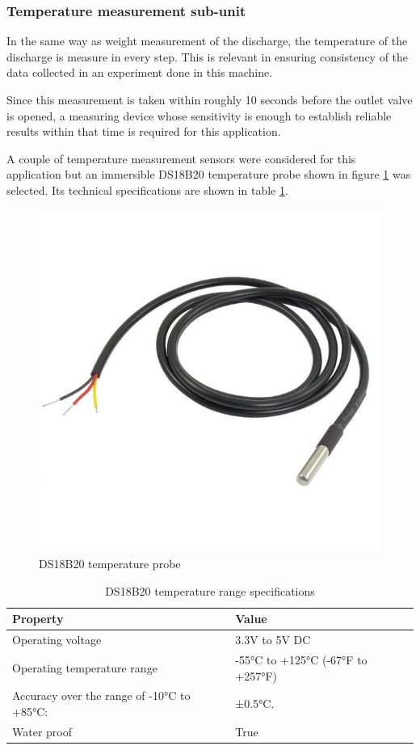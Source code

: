 \subsubsection{Temperature measurement sub-unit}
In the same way as weight measurement of the discharge, the temperature of the discharge is measure in every step. This is relevant in ensuring consistency of the data collected in an experiment done in this machine. 
\par
Since this measurement is taken within roughly 10 seconds before the outlet valve is opened, a measuring device whose sensitivity is enough to establish reliable results within that time is required for this application.
\par
A couple of temperature measurement sensors were considered for this application but an immersible DS18B20 temperature probe shown in figure \ref{fig:ds18b20_temperature} was selected. Its technical specifications are shown in table \ref{tab:ds18b20 temperature probe}.
\begin{figure}[H]
    \centering
    \includegraphics[width=.25\textwidth, height=.25\textheight]{Figures/ds18b20_temperature_probe.jpg}
    \caption[DS18B20 temperature probe]{DS18B20 temperature probe \cite{ds18b20}}
    \label{fig:ds18b20_temperature}
\end{figure}
\begin{table}[H]
\centering
\begin{tabular}{|l|l|}
\hline
\textbf{Property} & \textbf{Value} \\ \hline
Operating voltage & 3.3V  to 5V DC \\ \hline
Operating temperature range & -55°C to +125°C (-67°F to +257°F) \\ \hline
Accuracy over the range of -10°C to +85°C: & ±0.5°C. \\ \hline
Water proof & True \\ \hline
\end{tabular}
\caption[DS18B20 temperature range specifications]{DS18B20 temperature range specifications \cite{ds18b20}}
\label{tab:ds18b20 temperature probe}
\end{table}

